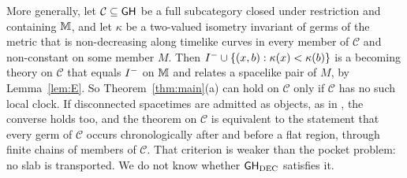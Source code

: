\begin{remark}\label{rem:clock}
More generally, let $\mathcal C\subseteq\mathsf{GH}$ be a full subcategory closed
under restriction and containing $\mathbb M$, and let $\kappa$ be a two-valued
isometry invariant of germs of the metric that is non-decreasing along
timelike curves in every member of $\mathcal C$ and non-constant on some
member $M$. Then $I^{-}\cup\{(x,b):\kappa(x)<\kappa(b)\}$ is a becoming theory
on $\mathcal C$ that equals $I^{-}$ on $\mathbb M$ and relates a spacelike pair of
$M$, by Lemma~\ref{lem:E}. So Theorem~\ref{thm:main}(a) can hold on
$\mathcal C$ only if $\mathcal C$ has no such local clock. If disconnected
spacetimes are admitted as objects, as in \citep[\S\S2.1--2.2]{FV2012}, the converse
holds too, and the theorem on $\mathcal C$ is equivalent to the statement that
every germ of $\mathcal C$ occurs chronologically after and before a flat
region, through finite chains of members of $\mathcal C$. That criterion is
weaker than the pocket problem: no slab is transported. We do not know whether
$\mathsf{GH}_{\mathrm{DEC}}$ satisfies it.
\end{remark}
